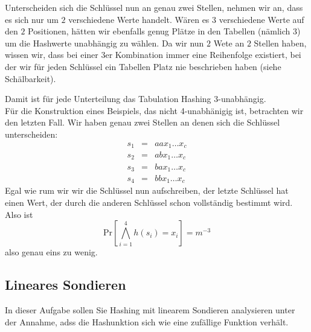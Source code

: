 \documentclass[11pt,a4paper,ngerman]{article}
\newcommand{\prob}[1]{\text{Pr}\left[ #1 \right]}
\begin{document}
Unterscheiden sich die Schlüssel nun an genau zwei Stellen, nehmen wir an, dass es sich nur um $2$ verschiedene Werte handelt. Wären es $3$ verschiedene Werte auf den $2$ Positionen, hätten wir ebenfalls genug Plätze in den Tabellen (nämlich 3) um die Hashwerte unabhängig zu wählen.
Da wir nun $2$ Wete an $2$ Stellen haben, wissen wir, dass bei einer 3er Kombination immer eine Reihenfolge existiert, bei der wir für jeden Schlüssel ein Tabellen Platz nie beschrieben haben (siehe Schälbarkeit).

Damit ist für jede Unterteilung das Tabulation Hashing 3-unabhängig.\\

Für die Konstruktion eines Beispiels, das nicht 4-unabhänigig ist, betrachten wir den letzten Fall. Wir haben genau zwei Stellen an denen sich die Schlüssel unterscheiden:
$$\begin{array}{rcl}
	s_1 &=& a a x_1 \ldots x_c\\
	s_2 &=& a b x_1 \ldots x_c\\
	s_3 &=& b a x_1 \ldots x_c\\
	s_4 &=& b b x_1 \ldots x_c
\end{array}$$
Egal wie rum wir wir die Schlüssel nun aufschreiben, der letzte Schlüssel hat einen Wert, der durch die anderen Schlüssel schon vollständig bestimmt wird.
Also ist 
$$
	\prob{\bigwedge_{i=1}^4 h(s_i) = x_i} = m^{-3}
$$
also genau eins zu wenig.

\subsection*{Lineares Sondieren}
In dieser Aufgabe sollen Sie Hashing mit linearem Sondieren analysieren unter der Annahme, adss die Hashunktion sich wie eine zufällige Funktion verhält.
\end{document}
